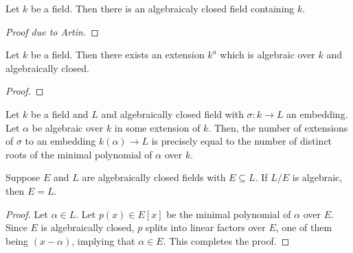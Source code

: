 \begin{theorem}
    Let $k$ be a field. Then there is an algebraicaly closed field containing $k$.
\end{theorem}
\begin{proof}[Proof due to Artin]
\end{proof}

\begin{corollary}
    Let $k$ be a field. Then there exists an extension $k^a$ which is algebraic over $k$ and algebraically closed.
\end{corollary}
\begin{proof}
    
\end{proof}

\begin{lemma}
    Let $k$ be a field and $L$ and algebraically closed field with $\sigma: k\to L$ an embedding. Let $\alpha$ be algebraic over $k$ in some extension of $k$. Then, the number of extensions of $\sigma$ to an embedding $k(\alpha)\to L$ is precisely equal to the number of distinct roots of the minimal polynomial of $\alpha$ over $k$.
\end{lemma}

\begin{lemma}
    Suppose $E$ and $L$ are algebraically closed fields with $E\subseteq L$. If $L/E$ is algebraic, then $E = L$.
\end{lemma}
\begin{proof}
    Let $\alpha\in L$. Let $p(x)\in E[x]$ be the minimal polynomial of $\alpha$ over $E$. Since $E$ is algebraically closed, $p$ splits into linear factors over $E$, one of them being $(x - \alpha)$, implying that $\alpha\in E$. This completes the proof.
\end{proof}


